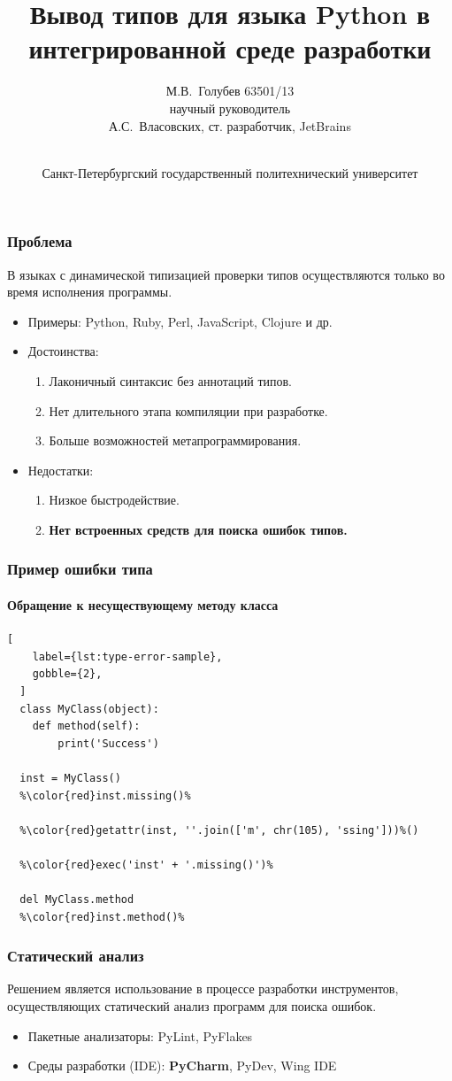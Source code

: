 \documentclass[handout]{beamer}
\title[Вывод типов для Python в IDE]{ Вывод типов для языка Python в интегрированной среде разработки }
\author[М.В.~Голубев]{%
  М.В.~Голубев 63501/13 \\ \vspace{.10cm} 
  {\small научный руководитель} \\ \vspace{.10cm} А.С.~Власовских, ст. разработчик, JetBrains
}
\institute[СПбГПУ]{
  \normalsize
  Направление: 230100 --- Информатика и вычислительная техника \\

  Магистерская программа: 230100.68.15 --- Технологии проектирования системного и
  прикладного программного обеспеченияй
}
\date[20.06.2014]{%
  \\ \vspace{1cm}
  \footnotesize Санкт-Петербургский государственный политехнический университет
}
\begin{document}
\frame{\titlepage}

\begin{frame}
  \frametitle{Проблема}

  В языках с динамической типизацией проверки типов осуществляются только во время исполнения программы.
  \begin{itemize}
      \item Примеры: Python, Ruby, Perl, JavaScript, Clojure и др.
      \item Достоинства:
        \begin{enumerate}
            \item Лаконичный синтаксис без аннотаций типов.
            \item Нет длительного этапа компиляции при разработке.
            \item Больше возможностей метапрограммирования.
        \end{enumerate}
      \item Недостатки:
        \begin{enumerate}
            \item Низкое быстродействие.
            \item \textbf{Нет встроенных средств для поиска ошибок типов.}
        \end{enumerate}
  \end{itemize}
    
\end{frame}


\begin{frame}[fragile]
  \frametitle{Пример ошибки типа}
  \framesubtitle{Обращение к несуществующему методу класса}

  \begin{lstlisting}[
    label={lst:type-error-sample},
    gobble={2},
  ]
  class MyClass(object):
    def method(self):
        print('Success')

  inst = MyClass()
  %\color{red}inst.missing()%

  %\color{red}getattr(inst, ''.join(['m', chr(105), 'ssing']))%()

  %\color{red}exec('inst' + '.missing()')%
  
  del MyClass.method
  %\color{red}inst.method()%

  \end{lstlisting}
    
\end{frame}

\begin{frame}
  \frametitle{Статический анализ}

  Решением является использование в процессе разработки инструментов,
  осуществляющих статический анализ программ для поиска ошибок.

  \begin{itemize}
      \item Пакетные анализаторы: PyLint, PyFlakes
      \item Среды разработки (IDE): \textbf{PyCharm}, PyDev, Wing IDE
  \end{itemize}
    
\end{frame}
\end{document}
